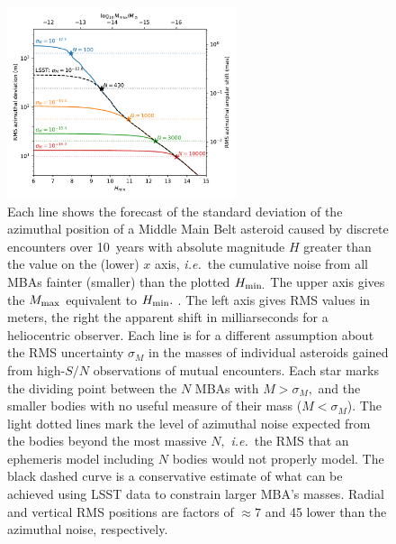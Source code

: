 \documentclass[linenumbers, onecolumn]{aastex631}
\newcommand{\ie}{\textit{i.e.\/}}
\begin{document}
\begin{figure}
  \centering
  \includegraphics[width=0.6\textwidth]{result.pdf}
  \caption{Each line shows the forecast of the standard deviation of the
    azimuthal position of a Middle Main Belt asteroid caused by discrete
    encounters over 10~years with absolute magnitude $H$ greater than the value on
    the (lower) $x$ axis, \ie\ the cumulative noise from all MBAs
    fainter (smaller) than the plotted $H_{\rm min.}$  The upper axis gives the $M_{\rm max}$ equivalent to $H_{\rm min}.$
.  The left axis gives RMS values in meters, the right
    the apparent shift in milliarseconds for a heliocentric observer.
    Each line is for a different assumption about the RMS uncertainty $\sigma_M$ in the masses of individual asteroids gained from high-$S/N$ observations of mutual encounters.
Each star marks the dividing point between the $N$ MBAs with $M>\sigma_M,$ and the smaller bodies with no useful measure of their mass ($M<\sigma_M$). The light dotted lines mark the level of azimuthal noise expected from the bodies beyond the most massive $N,$ \ie\ the RMS that an ephemeris model including $N$ bodies would not properly model. 
    The black dashed curve is a conservative estimate of what can be achieved using LSST data to constrain larger MBA's masses. Radial and vertical RMS positions are factors of $\approx 7$ and 45 lower than the azimuthal noise, respectively.}
  \label{fig:result}
\end{figure}
\end{document}
